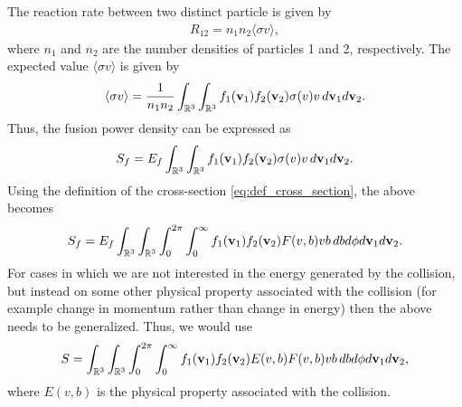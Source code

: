 \documentclass[oneside,a4paper,11pt]{report}
\begin{document}
\begin{itemize}
The reaction rate between two distinct particle is given by
\begin{align}
    R_{12} = n_1 n_2 \langle \sigma v \rangle,
\end{align}
where $n_1$ and $n_2$ are the number densities of particles 1 and 2, respectively. The expected value $\langle \sigma v \rangle$ is given by
\begin{equation}
    \langle \sigma v \rangle = \frac{1}{n_1 n_2} \int_{\mathbb{R}^3} \int_{\mathbb{R}^3} f_1(\mathbf{v}_1) f_2(\mathbf{v}_2) \sigma(v) v \, d\mathbf{v}_1 d\mathbf{v}_2.
\end{equation}
Thus, the fusion power density can be expressed as
\begin{equation}
    S_f = E_f \int_{\mathbb{R}^3} \int_{\mathbb{R}^3} f_1(\mathbf{v}_1) f_2(\mathbf{v}_2) \sigma(v) v \, d\mathbf{v}_1 d\mathbf{v}_2.
\end{equation}
Using the definition of the cross-section \cref{eq:def_cross_section}, the above becomes
\begin{equation}
    S_f = E_f \int_{\mathbb{R}^3} \int_{\mathbb{R}^3} \int_0^{2\pi} \int_0^\infty f_1(\mathbf{v}_1) f_2(\mathbf{v}_2) F(v,b) v b \, db d\phi d\mathbf{v}_1 d\mathbf{v}_2.
\end{equation}
For cases in which we are not interested in the energy generated by the collision, but instead on some other physical property associated with the collision (for example change in momentum rather than change in energy) then the above needs to be generalized. Thus, we would use
\begin{equation}
    S = \int_{\mathbb{R}^3} \int_{\mathbb{R}^3} \int_0^{2\pi} \int_0^\infty f_1(\mathbf{v}_1) f_2(\mathbf{v}_2) E(v,b) F(v,b) v b \, db d\phi d\mathbf{v}_1 d\mathbf{v}_2,
\end{equation}
where $E(v,b)$ is the physical property associated with the collision.

\end{itemize}



\end{document}
